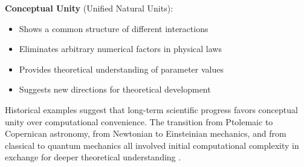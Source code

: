 	\textbf{Conceptual Unity} (Unified Natural Units):
	\begin{itemize}
		\item Shows a common structure of different interactions
		\item Eliminates arbitrary numerical factors in physical laws
		\item Provides theoretical understanding of parameter values
		\item Suggests new directions for theoretical development
	\end{itemize}
	
	Historical examples suggest that long-term scientific progress favors conceptual unity over computational convenience. The transition from Ptolemaic to Copernican astronomy, from Newtonian to Einsteinian mechanics, and from classical to quantum mechanics all involved initial computational complexity in exchange for deeper theoretical understanding \cite{Kuhn1962}.
	

